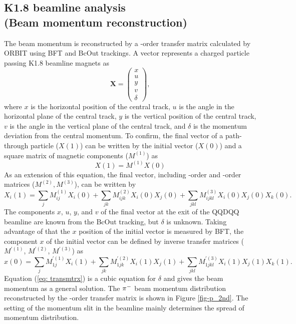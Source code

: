 \subsection{K1.8 beamline analysis\\(Beam momentum reconstruction)}
The beam momentum is reconstructed by a -order transfer matrix calculated by ORBIT using BFT and BcOut trackings. A vector represents a charged particle passing K1.8 beamline magnets as 
\begin{equation}
  \bm{X} = 
\begin{pmatrix}
 x  \\
 u  \\
 y  \\
 v  \\
 \delta   
\end{pmatrix},
\end{equation}
where $x$ is the horizontal position of the central track, $u$ is the angle in the horizontal plane of the central track, $y$ is the vertical position of the central track, $v$ is the angle in the vertical plane of the central track, and $\delta$ is the momentum deviation from the central momentum. To confirm, the final vector of a path-through particle ($X(1)$) can be written by the initial vector ($X(0)$) and a square matrix of magnetic components ($M^{(1)}$) as
\begin{equation}
  X(1) = M^{(1)} X(0)
\end{equation}
As an extension of this equation, the final vector, including -order and -order matrices ($M^{(2)}, M^{(3)}$), can be written by
\begin{equation}
  X_{i}(1) = \sum_{j} M_{ij}^{(1)} X_{i}(0) + \sum_{jk} M_{ijk}^{(2)} X_{i}(0)X_{j}(0) + \sum_{jkl} M_{ijkl}^{(3)} X_{i}(0)X_{j}(0)X_{k}(0).
\end{equation}
The components $x$, $u$, $y$, and $v$ of the final vector at the exit of the QQDQQ beamline are known from the BcOut tracking, but $\delta$ is unknown. Taking advantage of that the $x$ position of the initial vector is measured by BFT, the component $x$ of the initial vector can be defined by inverse transfer matrices ($M^{'(1)}$, $M^{'(2)}$, $M^{'(3)}$) as
\begin{equation}
  x(0) = \sum_{j} M_{1j}^{'(1)} X_{i}(1) + \sum_{jk} M_{1jk}^{'(2)} X_{i}(1)X_{j}(1) + \sum_{jkl} M_{1jkl}^{'(3)} X_{i}(1)X_{j}(1)X_{k}(1).
  \label{eq: transmtrx}
\end{equation}
Equation (\ref{eq: transmtrx}) is a cubic equation for $\delta$ and gives the beam momentum as a general solution. The $\pi^{-}$ beam momentum distribution reconstructed by the -order transfer matrix is shown in Figure \ref{fig-p_2nd}. The setting of the momentum slit in the beamline mainly determines the spread of momentum distribution.

